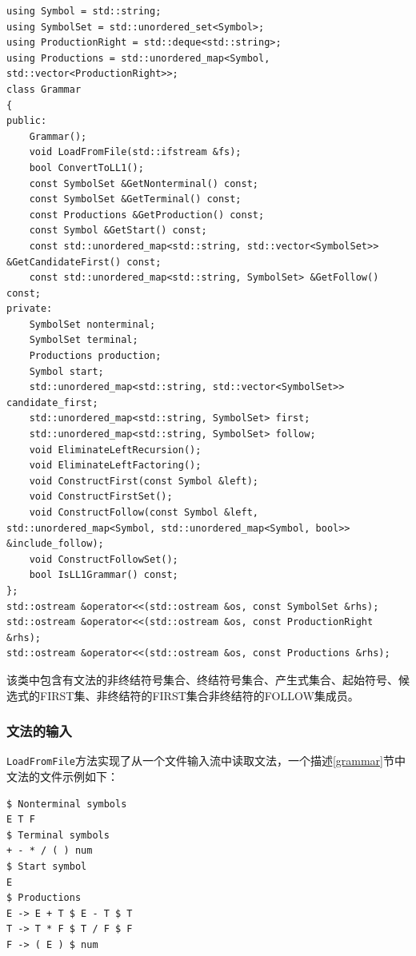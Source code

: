 \documentclass[lang=cn,11pt,a4paper,cite=authornum]{paper}
\begin{document}
\begin{code}
\begin{verbatim}
using Symbol = std::string;
using SymbolSet = std::unordered_set<Symbol>;
using ProductionRight = std::deque<std::string>;
using Productions = std::unordered_map<Symbol, std::vector<ProductionRight>>;
class Grammar
{
public:
    Grammar();
    void LoadFromFile(std::ifstream &fs);
    bool ConvertToLL1();
    const SymbolSet &GetNonterminal() const;
    const SymbolSet &GetTerminal() const;
    const Productions &GetProduction() const;
    const Symbol &GetStart() const;
    const std::unordered_map<std::string, std::vector<SymbolSet>> &GetCandidateFirst() const;
    const std::unordered_map<std::string, SymbolSet> &GetFollow() const;
private:
    SymbolSet nonterminal;
    SymbolSet terminal;
    Productions production;
    Symbol start;
    std::unordered_map<std::string, std::vector<SymbolSet>> candidate_first;
    std::unordered_map<std::string, SymbolSet> first;
    std::unordered_map<std::string, SymbolSet> follow;
    void EliminateLeftRecursion();
    void EliminateLeftFactoring();
    void ConstructFirst(const Symbol &left);
    void ConstructFirstSet();
    void ConstructFollow(const Symbol &left, std::unordered_map<Symbol, std::unordered_map<Symbol, bool>> &include_follow);
    void ConstructFollowSet();
    bool IsLL1Grammar() const;
};
std::ostream &operator<<(std::ostream &os, const SymbolSet &rhs);
std::ostream &operator<<(std::ostream &os, const ProductionRight &rhs);
std::ostream &operator<<(std::ostream &os, const Productions &rhs);
\end{verbatim}
\end{code}

该类中包含有文法的非终结符号集合、终结符号集合、产生式集合、起始符号、候选式的FIRST集、非终结符的FIRST集合非终结符的FOLLOW集成员。

\subsubsection{文法的输入}

\texttt{LoadFromFile}方法实现了从一个文件输入流中读取文法，一个描述\ref{grammar}节中文法的文件示例如下：

\label{grammar_text}
\begin{code}
\begin{verbatim}
$ Nonterminal symbols
E T F
$ Terminal symbols
+ - * / ( ) num
$ Start symbol
E
$ Productions
E -> E + T $ E - T $ T
T -> T * F $ T / F $ F
F -> ( E ) $ num
\end{verbatim}
\end{code}
\end{document}
